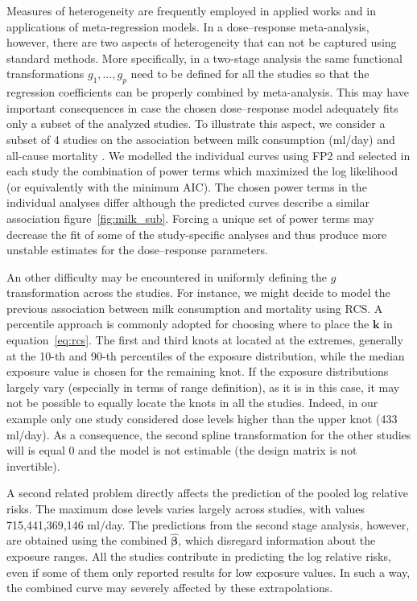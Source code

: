 \documentclass[11pt,a4paper,twoside,openany]{book}\usepackage{knitr}
\begin{document}
{Measures of heterogeneity are frequently employed in applied works and in applications of meta-regression models. In a dose--response meta-analysis, however, there are two aspects of heterogeneity that can not be captured using standard methods. More specifically, in a two-stage analysis the same functional transformations $g_1, \dots, g_p$ need to be defined for all the studies so that the regression coefficients can be properly combined by meta-analysis.
This may have important consequences in case the chosen dose--response model adequately fits only a subset of the analyzed studies. To illustrate this aspect, we consider a subset of 4 studies on the association between milk consumption (ml/day) and all-cause mortality \citep{larsson2015milk}. We modelled the individual curves using FP2 and selected in each study the combination of power terms which maximized the log likelihood (or equivalently with the minimum AIC). The chosen power terms in the individual analyses differ although the predicted curves describe a similar association figure~\ref{fig:milk_sub}. Forcing a unique set of power terms may decrease the fit of some of the study-specific analyses and thus produce more unstable estimates for the dose--response parameters.

\noindent An other difficulty may be encountered in uniformly defining the $g$ transformation across the studies. For instance, we might decide to model the previous association between milk consumption and mortality using RCS. A percentile approach is commonly adopted for choosing where to place the $\mathbf{k}$ in equation~\ref{eq:rcs}. The first and third knots at located at the extremes, generally at the 10-th and 90-th percentiles of the exposure distribution, while the median exposure value is chosen for the remaining knot.
If the exposure distributions largely vary (especially in terms of range definition), as it is in this case, it may not be possible to equally locate the knots in all the studies. Indeed, in our example only one study considered dose levels higher than the upper knot (433 ml/day). As a consequence, the second spline transformation for the other studies will is equal 0 and the model is not estimable (the design matrix is not invertible). 

\noindent A second related problem directly affects the prediction of the pooled log relative risks. The maximum dose levels varies largely across studies, with values 715,441,369,146 ml/day. 
The predictions from the second stage analysis, however, are obtained using the combined $\boldsymbol{\hat \beta}$, which disregard information about the exposure ranges. All the studies contribute in predicting the log relative risks, even if some of them only reported results for low exposure values. In such a way, the combined curve may severely affected by these extrapolations.

}
\end{document}
